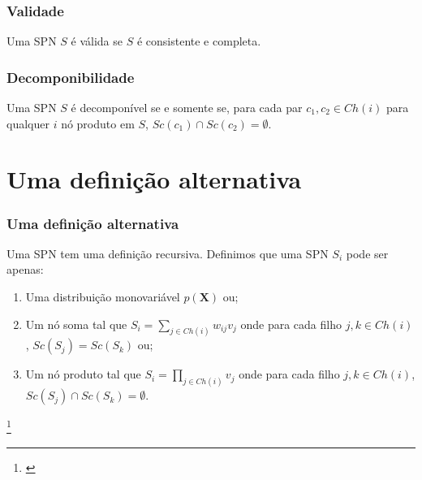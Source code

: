 \documentclass[10pt]{beamer}
\newcommand\nmfootnote[1]{%
  \begingroup
  \renewcommand\thefootnote{}\footnote{#1}%
  \addtocounter{footnote}{-1}%
  \endgroup
}
\theoremstyle{plain}
\newcommand{\set}[1]{\mathbf{#1}}
\begin{document}
\begin{frame}
  \frametitle{Validade}
  \begin{definition}[Validade]
    Uma SPN $S$ é válida se $S$ é consistente e completa.
  \end{definition}
\end{frame}

\begin{frame}
  \frametitle{Decomponibilidade}
  \begin{definition}[Decomponibilidade]
    Uma SPN $S$ é decomponível se e somente se, para cada par $c_1, c_2 \in Ch(i)$ para qualquer $i$
    nó produto em $S$, $Sc(c_1)\cap Sc(c_2)=\emptyset$.
  \end{definition}
\end{frame}


\section{Uma definição alternativa}

\begin{frame}
  \frametitle{Uma definição alternativa}
  \begin{definition}\label{gd-def}
    Uma SPN tem uma definição recursiva. Definimos que uma SPN $S_i$ pode ser apenas:
    \begin{enumerate}[label=(\roman*)]
      \item\label{gd-ref-1} Uma distribuição monovariável $p(\set{X})$ ou;
      \item\label{gd-ref-2} Um nó soma tal que $S_i=\sum_{j\in Ch(i)} w_{ij}v_j$ onde para cada filho
        $j,k\in Ch(i)$, $Sc(S_j)=Sc(S_k)$ ou;
      \item\label{gd-ref-3} Um nó produto tal que $S_i=\prod_{j\in Ch(i)} v_j$ onde para cada filho
        $j,k\in Ch(i)$, $Sc(S_j)\cap Sc(S_k)=\emptyset$.
    \end{enumerate}
  \end{definition}\nmfootnote{\cite{gens-domingos}}
\end{frame}
\end{document}
